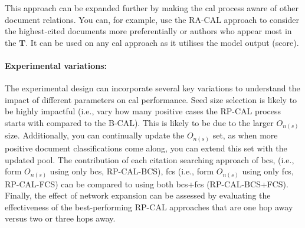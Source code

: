 \documentclass[10pt,oneside]{book}
\begin{document}
This approach can be expanded further by making the \gls*{cal} process aware of other document relations. You can, for example, use the RA-CAL approach to consider the highest-cited documents more preferentially or authors who appear most in the $\textbf{T}$. It can be used on any \gls*{cal} approach as it utilises the model output (score). 

\paragraph{Experimental variations:}
The experimental design can incorporate several key variations to understand the impact of different parameters on \gls*{cal} performance. Seed size selection is likely to be highly impactful (i.e., vary how many positive cases the RP-CAL process starts with compared to the B-CAL). This is likely to be due to the larger $O_{n{(s)}}$ size. Additionally, you can continually update the $O_{n{(s)}}$ set, as when more positive document classifications come along, you can extend this set with the updated pool. The contribution of each citation searching approach of \gls*{bcs}, (i.e., form $O_{n{(s)}}$ using only \gls*{bcs}, RP-CAL-BCS), \gls*{fcs} (i.e., form $O_{n{(s)}}$ using only \gls*{fcs}, RP-CAL-FCS) can be compared to using both \gls*{bcs}+\gls*{fcs} (RP-CAL-BCS+FCS). Finally, the effect of network expansion can be assessed by evaluating the effectiveness of the best-performing RP-CAL approaches that are one hop away versus two or three hops away.  
\end{document}
